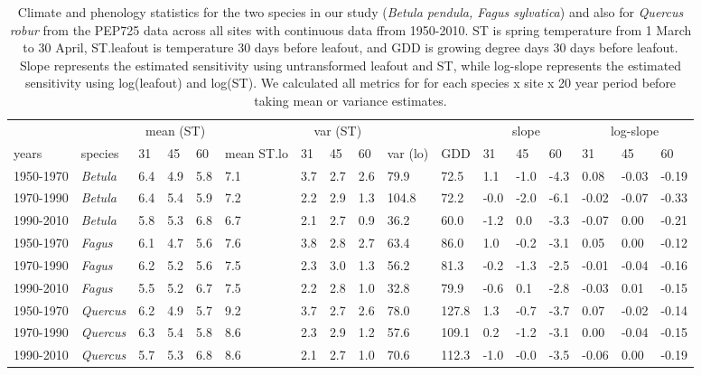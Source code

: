 \documentclass[11pt]{article}
\begin{document}
\begin{table}[ht]
\centering
\caption{Climate and phenology statistics for the two species in our study (\emph{Betula pendula, Fagus sylvatica}) and also for \emph{Quercus robur} from the PEP725 data across all sites with continuous data ffrom 1950-2010. ST is spring temperature from 1 March to 30 April, ST.leafout is temperature 30 days before leafout, and GDD is growing degree days 30 days before leafout. Slope represents the estimated sensitivity using untransformed leafout and ST, while log-slope represents the estimated sensitivity using log(leafout) and log(ST). We calculated all metrics for for each species  x site x 20 year period before taking mean or variance estimates.} 
\label{tab:pep20yr}
\begingroup\footnotesize
\begin{tabular}{|p{}|p{}|p{}|p{}|p{}|p{}|p{}|p{}|p{}|p{}|p{}|p{}|p{}|p{}|p{}|p{}|p{}|}
  \hline
\multicolumn{1}{|c|}{} & \multicolumn{1}{|c|}{} & \multicolumn{3}{|c|}{mean (ST)} & \multicolumn{1}{|c|}{} & \multicolumn{3}{|c|}{var (ST)} & \multicolumn{1}{|c|}{} & \multicolumn{1}{|c|}{} & \multicolumn{3}{|c|}{slope} & \multicolumn{3}{|c|}{log-slope} \\  \cline{3-5} \cline{7-9} \cline{12-14} \cline{15-17}
  years & species & 31 & 45 & 60 & mean ST.lo & 31 & 45 & 60 & var (lo) & GDD & 31 & 45 & 60 & 31 & 45 & 60 \\ 
  \hline
1950-1970 & \emph{Betula} & 6.4 & 4.9 & 5.8 & 7.1 & 3.7 & 2.7 & 2.6 & 79.9 & 72.5 & 1.1 & -1.0 & -4.3 & 0.08 & -0.03 & -0.19 \\ 
  1970-1990 & \emph{Betula} & 6.4 & 5.4 & 5.9 & 7.2 & 2.2 & 2.9 & 1.3 & 104.8 & 72.2 & -0.0 & -2.0 & -6.1 & -0.02 & -0.07 & -0.33 \\ 
  1990-2010 & \emph{Betula} & 5.8 & 5.3 & 6.8 & 6.7 & 2.1 & 2.7 & 0.9 & 36.2 & 60.0 & -1.2 & 0.0 & -3.3 & -0.07 & 0.00 & -0.21 \\ 
  1950-1970 & \emph{Fagus} & 6.1 & 4.7 & 5.6 & 7.6 & 3.8 & 2.8 & 2.7 & 63.4 & 86.0 & 1.0 & -0.2 & -3.1 & 0.05 & 0.00 & -0.12 \\ 
  1970-1990 & \emph{Fagus} & 6.2 & 5.2 & 5.6 & 7.5 & 2.3 & 3.0 & 1.3 & 56.2 & 81.3 & -0.2 & -1.3 & -2.5 & -0.01 & -0.04 & -0.16 \\ 
  1990-2010 & \emph{Fagus} & 5.5 & 5.2 & 6.7 & 7.5 & 2.2 & 2.8 & 1.0 & 32.8 & 79.9 & -0.6 & 0.1 & -2.8 & -0.03 & 0.01 & -0.15 \\ 
  1950-1970 & \emph{Quercus} & 6.2 & 4.9 & 5.7 & 9.2 & 3.7 & 2.7 & 2.6 & 78.0 & 127.8 & 1.3 & -0.7 & -3.7 & 0.07 & -0.02 & -0.14 \\ 
  1970-1990 & \emph{Quercus} & 6.3 & 5.4 & 5.8 & 8.6 & 2.3 & 2.9 & 1.2 & 57.6 & 109.1 & 0.2 & -1.2 & -3.1 & 0.00 & -0.04 & -0.15 \\ 
  1990-2010 & \emph{Quercus} & 5.7 & 5.3 & 6.8 & 8.6 & 2.1 & 2.7 & 1.0 & 70.6 & 112.3 & -1.0 & -0.0 & -3.5 & -0.06 & 0.00 & -0.19 \\ 
   \hline
\end{tabular}
\endgroup
\end{table}
\end{document}
